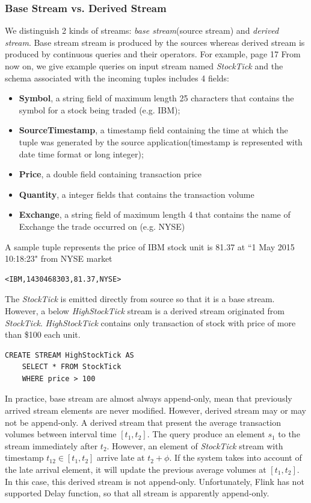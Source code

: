 \subsubsection*{Base Stream vs. Derived Stream}
We distinguish 2 kinds of streams: \textit{base stream}(source stream) and \textit{derived stream}. Base stream stream is produced by the sources whereas derived stream is produced by continuous queries and their operators\citep{Arasu:2006:CCQ}. For example, \citep{Golab:2010} page 17
From now on, we give example queries on input stream named \textit{StockTick}\citep{StreamBaseTut} and the schema associated with the incoming tuples includes 4 fields:
\begin{itemize}
\item \textbf{Symbol}, a string field of maximum length 25 characters that contains the symbol for a stock being traded (e.g. IBM);
\item \textbf{SourceTimestamp}, a timestamp field containing the time at which the tuple was generated by the source application(timestamp is represented with date time format or long integer);
\item \textbf{Price}, a double field containing transaction price
\item \textbf{Quantity}, a integer fields that contains the transaction volume
\item \textbf{Exchange}, a string field of maximum length 4 that contains the name of Exchange the trade occurred on (e.g. NYSE)

\end{itemize}
A sample tuple represents the price of IBM stock unit is 81.37 at ``1 May 2015 10:18:23" from NYSE market 
\begin{verbatim}
<IBM,1430468303,81.37,NYSE>
\end{verbatim}

The \textit{StockTick} is emitted directly from source so that it is a base stream. However, a below \textit{HighStockTick} stream is a derived stream originated from \textit{StockTick}. \textit{HighStockTick} contains only transaction of stock with price of more than \$100 each unit.

\begin{verbatim}
CREATE STREAM HighStockTick AS
	SELECT * FROM StockTick 
	WHERE price > 100
\end{verbatim}

In practice, base stream are almost always append-only, mean that previously arrived stream elements are never modified. However, derived stream may or may not be append-only\cite{Golab:2010}. A derived stream that present the average transaction volumes between interval time $[t_1, t_2]$. The query produce an element $s_1$ to the stream immediately after $t_2$. However, an element of \textit{StockTick} stream with timestamp 
$t_{12} \in [t_1,t_2]$ arrive late at $t_2+\phi$. If the system takes into account of the late arrival element, it will update the previous average volumes at $[t_1, t_2]$. In this case, this derived stream is not append-only. Unfortunately, Flink has not supported Delay function, so that all stream is apparently append-only.


